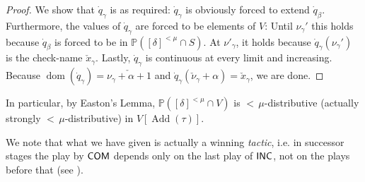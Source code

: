 \documentclass[a4paper]{amsart}
\theoremstyle{definition}
\theoremstyle{remark}
\theoremstyle{plain}
\newtheorem{mycol}[mydef]{Corollary}
\numberwithin{mydef}{section}
\DeclareMathOperator{\dom}{dom}
\DeclareMathOperator{\Add}{Add}
\newcommand{\dM}{\mathbb{M}}
\newcommand{\dP}{\mathbb{P}}
\newcommand{\COM}{\textsf{\textup{COM}}}
\newcommand{\INC}{\textsf{\textup{INC}}}
\begin{document}
\begin{proof}
		
		
		We show that $\dot{q}_{\gamma}$ is as required: $\dot{q}_{\gamma}$ is obviously forced to extend $\dot{q}_{\beta}$. Furthermore, the values of $\dot{q}_{\gamma}$ are forced to be elements of $V$: Until $\nu_{\gamma}'$ this holds because $\dot{q}_{\beta}$ is forced to be in $\dP([\delta]^{<\mu}\cap S)$. At $\nu'_\gamma$, it holds because $\dot{q}_{\gamma}(\nu_{\gamma}')$ is the check-name $\check{x}_\gamma$. Lastly, $\dot{q}_{\gamma}$ is continuous at every limit and increasing. Because $\dom(\dot{q}_{\gamma})=\check{\nu_{\gamma}+\alpha+1}$ and $\dot{q}_{\gamma}(\check{\nu}_{\gamma}+\alpha)=\check{x}_{\gamma}$, we are done.
	\end{proof}
	
	
	In particular, by Easton's Lemma, $\dP([\delta]^{<\mu}\cap V)$ is ${<}\,\mu$-distributive (actually strongly ${<}\,\mu$-distributive) in $V[\Add(\tau)]$.
	
		We note that what we have given is actually a winning \emph{tactic}, i.e$.$ in successor stages the play by $\COM$ depends only on the last play of $\INC$, not on the plays before that (see \cite{Yoshinobu2017}).
		
	
	
	
\end{document}
